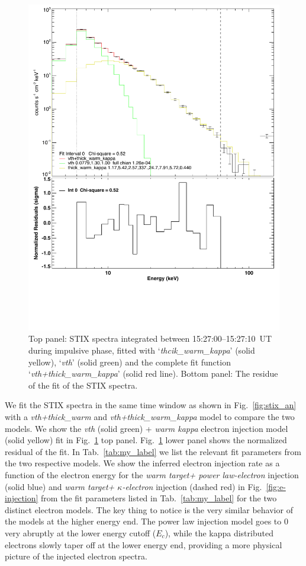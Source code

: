 \begin{figure}
    \centering
    \includegraphics[trim={0.3cm 4cm 0.2cm 0.2cm}, clip, width=0.95\linewidth]{Figures/fit_kappa.pdf}
    \caption{Top panel: STIX spectra integrated between 15:27:00{--}15:27:10~UT during impulsive phase, fitted with `\textit{thcik\_warm\_kappa}' (solid yellow), `\textit{vth}' (solid green) and the complete fit function `\textit{vth+thick\_warm\_kappa}' (solid red line). Bottom panel: The residue of the fit of the STIX spectra.}
    \label{fig:fit_kappa}
\end{figure}

We fit the STIX spectra in the same time window as shown in Fig.~\ref{fig:stix_an} with a {\it vth+thick\_warm} and {\it vth+thick\_warm\_kappa} model to compare the two models. We show the {\it vth} (solid green) + {\it warm kappa} electron injection model (solid yellow) fit in Fig.~\ref{fig:fit_kappa} top panel. Fig.~\ref{fig:fit_kappa} lower panel shows the normalized residual of the fit. In Tab.~\ref{tab:my_label} we list the relevant fit parameters from the two respective models. We show the inferred electron injection rate as a function of the electron energy for the {\it warm target+ power law-electron} injection (solid blue) and {\it warm target+ $\kappa$-electron} injection (dashed red) in Fig.~\ref{fig:e-injection} from the fit parameters listed in Tab.~\ref{tab:my_label} for the two distinct electron models. The key thing to notice is the very similar behavior of the models at the higher energy end. The power law injection model goes to 0 very abruptly at the lower energy cutoff ($E_c$), while the kappa distributed electrons slowly taper off at the lower energy end, providing a more physical picture of the injected electron spectra.

